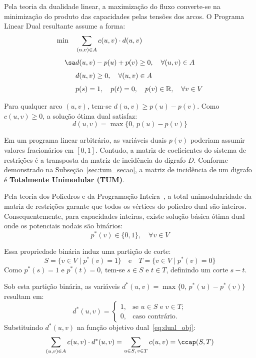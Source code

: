 Pela teoria da dualidade linear, a maximização do fluxo converte-se na minimização do produto das capacidades pelas tensões dos arcos. O Programa Linear Dual resultante assume a forma:
\begin{align}
    \min \quad & \sum_{(u,v) \in A} c(u,v) \cdot d(u,v) \label{eq:dual_obj} \\[4pt]
    \sa & d(u,v) - p(u) + p(v) \ge 0, \quad \forall (u,v) \in A \label{eq:dual_tensao} \\[4pt]
    & d(u,v) \ge 0, \quad \forall (u,v) \in A \\[4pt]
    & p(s) = 1, \quad p(t) = 0, \quad p(v) \in \mathbb{R}, \quad \forall v \in V
\end{align}

Para qualquer arco $(u,v)$, tem-se $d(u,v) \ge p(u) - p(v)$. Como $c(u,v) \ge 0$, a solução ótima dual satisfaz:
\begin{equation}
    d(u,v) = \max\{0, \, p(u) - p(v)\}
\end{equation}

Em um programa linear arbitrário, as variáveis duais $p(v)$ poderiam assumir valores fracionários em $[0, 1]$. Contudo, a matriz de coeficientes do sistema de restrições é a transposta da matriz de incidência do digrafo $D$. Conforme demonstrado na Subseção~\ref{sec:tum_secao}, a matriz de incidência de um digrafo é \textbf{Totalmente Unimodular (TUM)}.

Pela teoria dos Poliedros e da Programação Inteira~\cite{cook1998combinatorial, korte2018combinatorial}, a total unimodularidade da matriz de restrições garante que todos os vértices do poliedro dual são inteiros. Consequentemente, para capacidades inteiras, existe solução básica ótima dual onde os potenciais nodais são binários:
\begin{equation}
    p^*(v) \in \{0, 1\}, \quad \forall v \in V
\end{equation}

Essa propriedade binária induz uma partição de corte:
\begin{equation}
    S = \{v \in V \mid p^*(v) = 1\} \quad \text{e} \quad T = \{v \in V \mid p^*(v) = 0\}
\end{equation}
Como $p^*(s) = 1$ e $p^*(t) = 0$, tem-se $s \in S$ e $t \in T$, definindo um corte $s-t$.

Sob esta partição binária, as variáveis $d^*(u,v) = \max\{0, \, p^*(u) - p^*(v)\}$ resultam em:
\begin{equation}
    d^*(u,v) = \begin{cases}
        1, & \text{se } u \in S \text{ e } v \in T; \\
        0, & \text{caso contrário}.
    \end{cases}
\end{equation}
Substituindo $d^*(u,v)$ na função objetivo dual~\eqref{eq:dual_obj}:
\begin{equation}
    \sum_{(u,v) \in A} c(u,v) \cdot d^*(u,v) = \sum_{u \in S, \, v \in T} c(u,v) = \ccap(S, T)
\end{equation}

